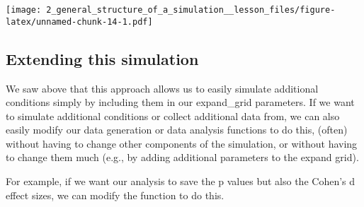 \documentclass[
]{article}
\begin{document}
\texttt{[image: 2\_general\_structure\_of\_a\_simulation\_\_lesson\_files/figure-latex/unnamed-chunk-14-1.pdf]}

\hypertarget{extending-this-simulation}{%
\subsection{Extending this simulation}\label{extending-this-simulation}}

We saw above that this approach allows us to easily simulate additional
conditions simply by including them in our expand\_grid parameters. If
we want to simulate additional conditions or collect additional data
from, we can also easily modify our data generation or data analysis
functions to do this, (often) without having to change other components
of the simulation, or without having to change them much (e.g., by
adding additional parameters to the expand grid).

For example, if we want our analysis to save the p values but also the
Cohen's d effect sizes, we can modify the function to do this.
\end{document}

